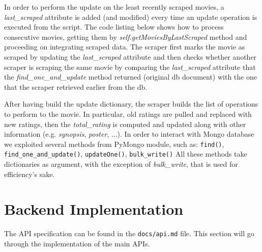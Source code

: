 \documentclass[11pt]{article}
\begin{document}
In order to perform the update on the least recently scraped movies, a \emph{last\_scraped} attribute is added (and modified) every time an update operation is executed from the script. The code listing below shows how to process consecutive movies, getting them by \emph{self.\-get\-Movies\-By\-Last\-Scraped} method and proceeding on integrating scraped data.
The scraper first marks the movie as scraped by updating the \emph{last\_scraped} attribute and then checks whether another scraper is scraping the same movie by comparing the \emph{last\_scraped} attribute that the \emph{find\_one\_and\_update} method returned (original db document) with the one that the scraper retrieved earlier from the db.

After having build the update dictionary, the scraper builds the list of operations to perform to the movie. In particular, old ratings are pulled and replaced with new ratings, then the \emph{total\_rating} is computed and updated along with other information (e.g. \emph{synopsis}, \emph{poster}, ...). In order to interact with Mongo database we exploited several methods from PyMongo module, such as: \texttt{find()}, \texttt{find\_one\_and\_update()}, \texttt{updateOne()}, \texttt{bulk\_write()}
All these methods take dictionaries as argument, with the exception of \emph{bulk\_write}, that is used for efficiency's sake.




\section{Backend Implementation}
The API specification can be found in the \texttt{docs/api.md} file. This section will go through the implementation of the main APIs. 
\end{document}
